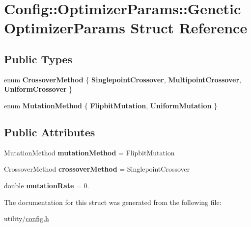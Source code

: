 \hypertarget{struct_config_1_1_optimizer_params_1_1_genetic_optimizer_params}{}\section{Config\+:\+:Optimizer\+Params\+:\+:Genetic\+Optimizer\+Params Struct Reference}
\label{struct_config_1_1_optimizer_params_1_1_genetic_optimizer_params}
\subsection*{Public Types}
\begin{DoxyCompactItemize}
\item 
\hypertarget{struct_config_1_1_optimizer_params_1_1_genetic_optimizer_params_a0bafa474ce6ace62c75d63564468ea27}{}\label{struct_config_1_1_optimizer_params_1_1_genetic_optimizer_params_a0bafa474ce6ace62c75d63564468ea27} 
enum {\bfseries Crossover\+Method} \{ {\bfseries Singlepoint\+Crossover}, 
{\bfseries Multipoint\+Crossover}, 
{\bfseries Uniform\+Crossover}
 \}
\item 
\hypertarget{struct_config_1_1_optimizer_params_1_1_genetic_optimizer_params_abc1399b8071aa3d3c1fa331b480740cf}{}\label{struct_config_1_1_optimizer_params_1_1_genetic_optimizer_params_abc1399b8071aa3d3c1fa331b480740cf} 
enum {\bfseries Mutation\+Method} \{ {\bfseries Flipbit\+Mutation}, 
{\bfseries Uniform\+Mutation}
 \}
\end{DoxyCompactItemize}
\subsection*{Public Attributes}
\begin{DoxyCompactItemize}
\item 
\hypertarget{struct_config_1_1_optimizer_params_1_1_genetic_optimizer_params_a0a66174c6c10d110bfbf611a56d4865e}{}\label{struct_config_1_1_optimizer_params_1_1_genetic_optimizer_params_a0a66174c6c10d110bfbf611a56d4865e} 
Mutation\+Method {\bfseries mutation\+Method} = Flipbit\+Mutation
\item 
\hypertarget{struct_config_1_1_optimizer_params_1_1_genetic_optimizer_params_a85e672f753dddb28d37b777412fdb04d}{}\label{struct_config_1_1_optimizer_params_1_1_genetic_optimizer_params_a85e672f753dddb28d37b777412fdb04d} 
Crossover\+Method {\bfseries crossover\+Method} = Singlepoint\+Crossover
\item 
\hypertarget{struct_config_1_1_optimizer_params_1_1_genetic_optimizer_params_a4bd3aca3e2ae556590d97f720c07d4fc}{}\label{struct_config_1_1_optimizer_params_1_1_genetic_optimizer_params_a4bd3aca3e2ae556590d97f720c07d4fc} 
double {\bfseries mutation\+Rate} = 0.
\end{DoxyCompactItemize}


The documentation for this struct was generated from the following file\+:\begin{DoxyCompactItemize}
\item 
utility/\hyperlink{config_8h}{config.\+h}\end{DoxyCompactItemize}
